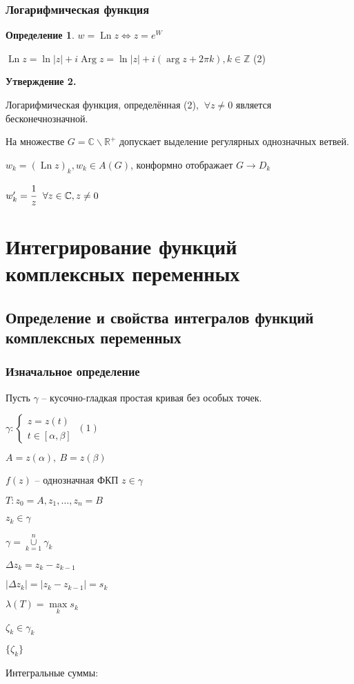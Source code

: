\documentclass[draft]{report}
\newcommand{\R}{\mathbb{R}}
\newcommand{\Z}{\mathbb{Z}}
\renewcommand{\C}{\mathbb{C}}
\newcommand{\LRA}{\Leftrightarrow}
\newcommand{\Ln}{\mathop{\mathrm{Ln}}\nolimits}
\newcommand{\Arg}{\mathop{\mathrm{Arg}}\nolimits}
\renewcommand{\a}{\alpha}
\renewcommand{\b}{\beta}
\newcommand{\g}{\gamma}
\renewcommand{\l}{\lambda}
\newcommand{\D}{\Delta}
\newcommand{\F}{\ \forall}
\newcommand{\sys}[1]{\left\{\begin{matrix}#1\end{matrix}\right.}
\newcommand{\opr}[1]{\begin{opred}#1\end{opred}}
\newtheorem*{opred}{Определение}
\theoremstyle{remark}
\begin{document}
\subsection{Логарифмическая функция}

\opr{$w=\Ln z \LRA z=e^W$}

$\Ln z=\ln|z|+i\Arg z=\ln |z|+i(\arg z+2\pi k), k\in\Z$ (2)

{\bfseries Утверждение 2.}

Логарифмическая функция, определённая (2), $\F z\neq0$ является бесконечнозначной.

На множестве $G=\C\smallsetminus\R^+$ допускает выделение регулярных однозначных ветвей.

$w_k=(\Ln z)_k, w_k\in A(G)$, конформно отображает $G\to D_k$

$w_k'=\cfrac 1z\ \F z\in\C, z\neq0$

\chapter{Интегрирование функций комплексных переменных}

\section{Определение и свойства интегралов функций комплексных переменных}

\subsection{Изначальное определение}

Пусть $\g$ -- кусочно-гладкая простая кривая без особых точек.

$\g\colon\sys{z=z(t)\\t\in[\a,\b]}\ (1)$

$A=z(\a),\ B=z(\b)$

$f(z)$ -- однозначная ФКП $z\in\g$

$T\colon z_0=A,z_1,\ldots,z_n=B$

$z_k\in\g$

$\g=\overset{n}{\underset{k=1}{\cup}}\g_k$

$\D z_k=z_k-z_{k-1}$

$|\D z_k|=|z_k-z_{k-1}|=s_k$

$\l(T)=\underset{k}{\max}s_k$

$\zeta_k\in\g_k$

$\{\zeta_k\}$

Интегральные суммы:
\end{document}
